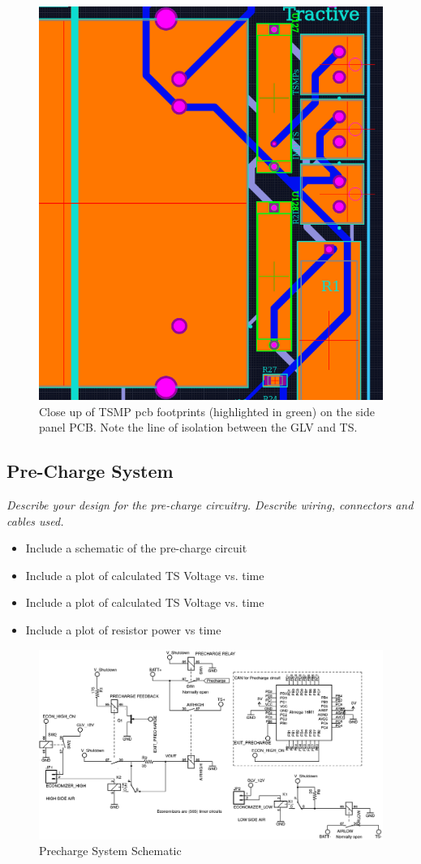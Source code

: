 \documentclass{article}
\begin{document}
    \begin{figure}[H]
        \centering
        \includegraphics[width = 0.6 \textwidth]{tsmpcloseup}
        \caption{Close up of TSMP pcb footprints (highlighted in green) on the side panel PCB. Note the line of isolation between the GLV and TS. }
        \label{tsmpPCB}
    \end{figure}

    \subsection{Pre-Charge System}

    \textit{Describe your design for the pre-charge circuitry. Describe wiring, connectors and cables used.}
    \begin{itemize}
        \item Include a schematic of the pre-charge circuit
        \item Include a plot of calculated TS Voltage vs. time
        \item Include a plot of calculated TS Voltage vs. time
        \item Include a plot of resistor power vs time
    \end{itemize}


    \begin{figure}[H]
        \centering
        \includegraphics[width = 0.7 \textwidth]{precharge}
        \caption{Precharge System Schematic}
        \label{prechargeschem}
    \end{figure}
\end{document}
